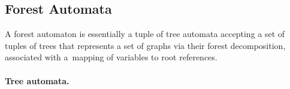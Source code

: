 {%


\subsection{Forest Automata}\label{sec:fa}

A forest automaton is essentially a tuple of tree automata accepting a set of
tuples of trees that represents a set of graphs via their forest decomposition,
associated with a~mapping of variables to root references.

\paragraph{Tree automata.}

}
